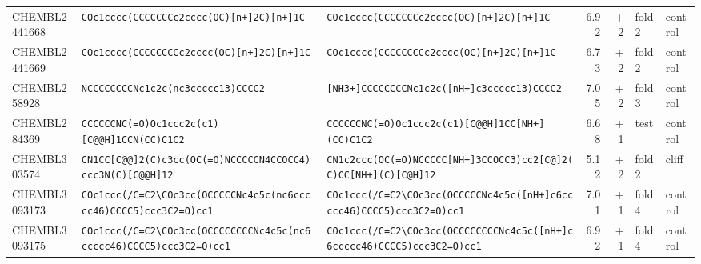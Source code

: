 \begin{longtable}{l p{4.4cm} p{4.4cm} r r l l}
CHEMBL2441668 & \texttt{COc1cccc(\allowbreak{}CCCCCCCc2cccc(\allowbreak{}OC)\allowbreak{}[n+]\allowbreak{}2C)\allowbreak{}[n+]\allowbreak{}1C} & \texttt{COc1cccc(\allowbreak{}CCCCCCCc2cccc(\allowbreak{}OC)\allowbreak{}[n+]\allowbreak{}2C)\allowbreak{}[n+]\allowbreak{}1C} & 6.92 & +2 & fold 2 & control \\
CHEMBL2441669 & \texttt{COc1cccc(\allowbreak{}CCCCCCCCc2cccc(\allowbreak{}OC)\allowbreak{}[n+]\allowbreak{}2C)\allowbreak{}[n+]\allowbreak{}1C} & \texttt{COc1cccc(\allowbreak{}CCCCCCCCc2cccc(\allowbreak{}OC)\allowbreak{}[n+]\allowbreak{}2C)\allowbreak{}[n+]\allowbreak{}1C} & 6.73 & +2 & fold 2 & control \\
CHEMBL258928 & \texttt{NCCCCCCCCNc1c2c(\allowbreak{}nc3ccccc13)\allowbreak{}CCCC2} & \texttt{[NH3+]\allowbreak{}CCCCCCCCNc1c2c(\allowbreak{}[nH+]\allowbreak{}c3ccccc13)\allowbreak{}CCCC2} & 7.05 & +2 & fold 3 & control \\
CHEMBL284369 & \texttt{CCCCCCNC(\allowbreak{}=\allowbreak{}O)\allowbreak{}Oc1ccc2c(\allowbreak{}c1)\allowbreak{}[C@@H]\allowbreak{}1CCN(\allowbreak{}CC)\allowbreak{}C1C2} & \texttt{CCCCCCNC(\allowbreak{}=\allowbreak{}O)\allowbreak{}Oc1ccc2c(\allowbreak{}c1)\allowbreak{}[C@@H]\allowbreak{}1CC[NH+]\allowbreak{}(\allowbreak{}CC)\allowbreak{}C1C2} & 6.68 & +1 & test & control \\
CHEMBL303574 & \texttt{CN1CC[C@@]\allowbreak{}2(\allowbreak{}C)\allowbreak{}c3cc(\allowbreak{}OC(\allowbreak{}=\allowbreak{}O)\allowbreak{}NCCCCCN4CCOCC4)\allowbreak{}ccc3N(\allowbreak{}C)\allowbreak{}[C@@H]\allowbreak{}12} & \texttt{CN1c2ccc(\allowbreak{}OC(\allowbreak{}=\allowbreak{}O)\allowbreak{}NCCCCC[NH+]\allowbreak{}3CCOCC3)\allowbreak{}cc2[C@]\allowbreak{}2(\allowbreak{}C)\allowbreak{}CC[NH+]\allowbreak{}(\allowbreak{}C)\allowbreak{}[C@H]\allowbreak{}12} & 5.12 & +2 & fold 2 & cliff \\
CHEMBL3093173 & \texttt{COc1ccc(\allowbreak{}/\allowbreak{}C=\allowbreak{}C2\textbackslash{}COc3cc(\allowbreak{}OCCCCCNc4c5c(\allowbreak{}nc6ccccc46)\allowbreak{}CCCC5)\allowbreak{}ccc3C2=\allowbreak{}O)\allowbreak{}cc1} & \texttt{COc1ccc(\allowbreak{}/\allowbreak{}C=\allowbreak{}C2\textbackslash{}COc3cc(\allowbreak{}OCCCCCNc4c5c(\allowbreak{}[nH+]\allowbreak{}c6ccccc46)\allowbreak{}CCCC5)\allowbreak{}ccc3C2=\allowbreak{}O)\allowbreak{}cc1} & 7.01 & +1 & fold 4 & control \\
CHEMBL3093175 & \texttt{COc1ccc(\allowbreak{}/\allowbreak{}C=\allowbreak{}C2\textbackslash{}COc3cc(\allowbreak{}OCCCCCCCCNc4c5c(\allowbreak{}nc6ccccc46)\allowbreak{}CCCC5)\allowbreak{}ccc3C2=\allowbreak{}O)\allowbreak{}cc1} & \texttt{COc1ccc(\allowbreak{}/\allowbreak{}C=\allowbreak{}C2\textbackslash{}COc3cc(\allowbreak{}OCCCCCCCCNc4c5c(\allowbreak{}[nH+]\allowbreak{}c6ccccc46)\allowbreak{}CCCC5)\allowbreak{}ccc3C2=\allowbreak{}O)\allowbreak{}cc1} & 6.92 & +1 & fold 4 & control \\

\end{longtable}
